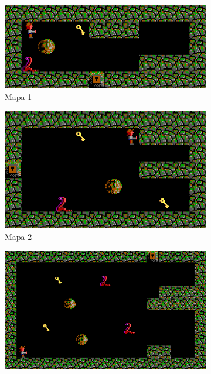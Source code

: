 \documentclass[11pt,spanish]{article}
\begin{document}
			\begin{figure}[H]
				\begin{subfigure}[b]{0.29\linewidth}
					\includegraphics[width=\linewidth]{astar/lab1.png}
					\caption{Mapa 1}
				\end{subfigure}
				\begin{subfigure}[b]{0.29\linewidth}
					\includegraphics[width=\linewidth]{astar/lab2.png}
					\caption{Mapa 2}
				\end{subfigure}
				\begin{subfigure}[b]{0.41\linewidth}
					\includegraphics[width=\linewidth]{astar/lab3.png}

\end{subfigure}
\end{figure}
\end{document}
